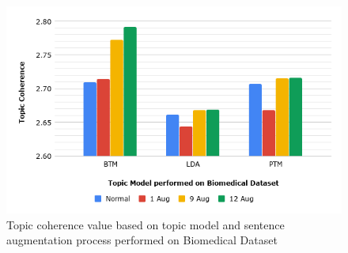 \documentclass[10pt, conference, compsocconf]{IEEEtran}
\begin{document}
\begin{figure} [H]
	\includegraphics[scale=0.425]{topic3.png}
	\caption{Topic coherence value based on topic model and sentence augmentation process performed on Biomedical Dataset}
\label{fig_tmv}
\end{figure}


\end{document}
